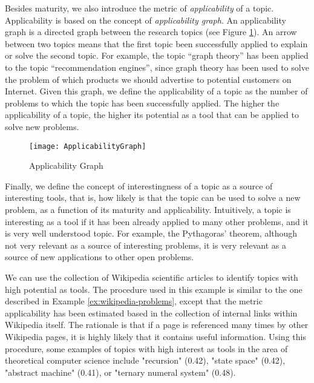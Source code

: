 Besides maturity, we also introduce the metric of \emph{applicability} of a topic. Applicability is based on the concept of \emph{applicability graph}. An applicability graph is a directed graph between the research topics (see Figure \ref{fig:ApplicabilityGraph}). An arrow between two topics means that the first topic been successfully applied to explain or solve the second topic. For example, the topic “graph theory” has been applied to the topic “recommendation engines”, since graph theory has been used to solve the problem of which products we should advertise to potential customers on Internet. Given this graph, we define the applicability of a topic as the number of problems to which the topic has been successfully applied. The higher the applicability of a topic, the higher its potential as a tool that can be applied to solve new problems.

\begin{figure}[h]
\centering\texttt{[image: ApplicabilityGraph]}
\caption{\label{fig:ApplicabilityGraph}Applicability Graph}
\end{figure}

Finally, we define the concept of interestingness of a topic as a source of interesting tools, that is, how likely is that the topic can be used to solve a new problem, as a function of its maturity and applicability. Intuitively, a topic is interesting as a tool if it has been already applied to many other problems, and it is very well understood topic. For example, the Pythagoras' theorem, although not very relevant as a source of interesting problems, it is very relevant as a source of new applications to other open problems.

\begin{example}
We can use the collection of Wikipedia scientific articles to identify topics with high potential as tools. The procedure used in this example is similar to the one described in Example \ref{ex:wikipedia-problems}, except that the metric applicability has been estimated based in the collection of internal links within Wikipedia itself. The rationale is that if a page is referenced many times by other Wikipedia pages, it is highly likely that it contains useful information. Using this procedure, some examples of topics with high interest as tools in the area of theoretical computer science include "recursion" (0.42), "state space" (0.42), "abstract machine" (0.41), or "ternary numeral system" (0.48).
\end{example}

